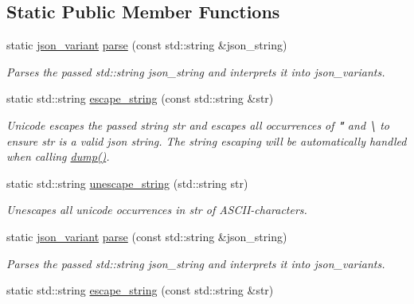 \subsection*{Static Public Member Functions}
\begin{DoxyCompactItemize}
\item 
static \hyperlink{classJSONLIB__NAMESPACE_1_1json__variant}{json\+\_\+variant} \hyperlink{classJSONLIB__NAMESPACE_1_1json__variant_ae9198f05ef46e3ada2a10d942e8478d0}{parse} (const std\+::string \&json\+\_\+string)
\begin{DoxyCompactList}\small\item\em Parses the passed std\+::string {\ttfamily json\+\_\+string} and interprets it into json\+\_\+variants. \end{DoxyCompactList}\item 
static std\+::string \hyperlink{classJSONLIB__NAMESPACE_1_1json__variant_a4c2354098f97b91b5a07dbda981673cf}{escape\+\_\+string} (const std\+::string \&str)
\begin{DoxyCompactList}\small\item\em Unicode escapes the passed string {\ttfamily str} and escapes all occurrences of {\bfseries "} and {\bfseries \textbackslash{}} to ensure {\ttfamily str} is a valid json string. The string escaping will be automatically handled when calling \hyperlink{classJSONLIB__NAMESPACE_1_1json__variant_a72d4a39d77b76f076354219edc6ea4a0}{dump()}. \end{DoxyCompactList}\item 
static std\+::string \hyperlink{classJSONLIB__NAMESPACE_1_1json__variant_ab3b411443074a97949b5675676d0b136}{unescape\+\_\+string} (std\+::string str)
\begin{DoxyCompactList}\small\item\em Unescapes all unicode occurrences in {\ttfamily str} of A\+S\+C\+I\+I-\/characters. \end{DoxyCompactList}\item 
static \hyperlink{classJSONLIB__NAMESPACE_1_1json__variant}{json\+\_\+variant} \hyperlink{classJSONLIB__NAMESPACE_1_1json__variant_a358a8e1485bc81dbed1594ce6c5b3552}{parse} (const std\+::string \&json\+\_\+string)
\begin{DoxyCompactList}\small\item\em Parses the passed std\+::string {\ttfamily json\+\_\+string} and interprets it into json\+\_\+variants. \end{DoxyCompactList}\item 
static std\+::string \hyperlink{classJSONLIB__NAMESPACE_1_1json__variant_a12b4d75511a0e52da1f1e726755fe618}{escape\+\_\+string} (const std\+::string \&str)

\end{DoxyCompactItemize}
